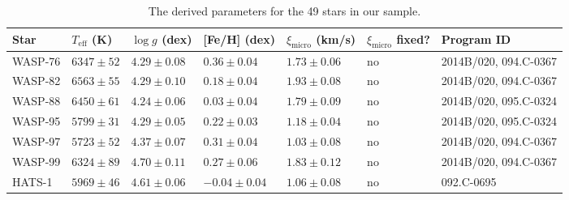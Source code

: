 \documentclass{aa}
\begin{document}
\begin{table}[htb!]
    \caption{The derived parameters for the 49 stars in our sample.}
    \label{tab:results}
    \centering
    \begin{tabular}{lllllll}
      \hline\hline
        Star      & $T_\mathrm{eff}$ (K) &  $\log g$ (dex)     &  [Fe/H] (dex)        &  $\xi_\mathrm{micro}$ (km/s) & $\xi_\mathrm{micro}$ fixed? & Program ID \\
      \hline
      WASP-76     &  $6347 \pm  52$      &  $4.29 \pm 0.08$    &  $ 0.36 \pm 0.04$    &  $1.73 \pm 0.06$             &             no              &  2014B/020,  094.C-0367                                                                                                  \\
      WASP-82     &  $6563 \pm  55$      &  $4.29 \pm 0.10$    &  $ 0.18 \pm 0.04$    &  $1.93 \pm 0.08$             &             no              &  2014B/020,  094.C-0367                                                                                                  \\
      WASP-88     &  $6450 \pm  61$      &  $4.24 \pm 0.06$    &  $ 0.03 \pm 0.04$    &  $1.79 \pm 0.09$             &             no              &  2014B/020,  095.C-0324                                                                                                  \\
      WASP-95     &  $5799 \pm  31$      &  $4.29 \pm 0.05$    &  $ 0.22 \pm 0.03$    &  $1.18 \pm 0.04$             &             no              &  2014B/020,  095.C-0324                                                                                                  \\
      WASP-97     &  $5723 \pm  52$      &  $4.37 \pm 0.07$    &  $ 0.31 \pm 0.04$    &  $1.03 \pm 0.08$             &             no              &  2014B/020,  094.C-0367                                                                                                  \\
      WASP-99     &  $6324 \pm  89$      &  $4.70 \pm 0.11$    &  $ 0.27 \pm 0.06$    &  $1.83 \pm 0.12$             &             no              &  2014B/020,  094.C-0367                                                                                                  \\
       HATS-1     &  $5969 \pm  46$      &  $4.61 \pm 0.06$    &  $-0.04 \pm 0.04$    &  $1.06 \pm 0.08$             &             no              &  092.C-0695                                                                                                              \\

\end{tabular}
\end{table}
\end{document}
